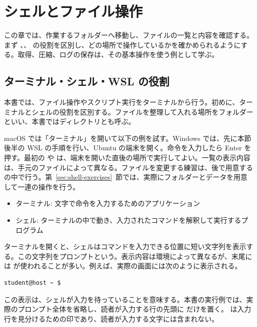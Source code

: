 \chapter{シェルとファイル操作}
\label{chap:shell}

この章では、作業するフォルダーへ移動し、ファイルの一覧と内容を確認する。まず 、、 の役割を区別し、どの場所で操作しているかを確かめられるようにする。取得、圧縮、ログの保存は、その基本操作を使う例として学ぶ。

\section{ターミナル・シェル・WSL の役割}
\label{SEC:shell}
本書では、ファイル操作やスクリプト実行をターミナルから行う。初めに、ターミナルとシェルの役割を区別する。ファイルを整理して入れる場所をフォルダーといい、本書ではディレクトリとも呼ぶ。

macOS では「ターミナル」を開いて以下の例を試す。Windows では、先に本節後半の WSL の手順を行い、Ubuntu の端末を開く。命令を入力したら Enter を押す。最初の  や  は、端末を開いた直後の場所で実行してよい。一覧の表示内容は、手元のファイルによって異なる。ファイルを変更する練習は、後で用意する  の中で行う。第~\ref{sec:shell-exercises}~節では、実際にフォルダーとデータを用意して一連の操作を行う。

\begin{itemize}
\item ターミナル: 文字で命令を入力するためのアプリケーション
\item シェル: ターミナルの中で動き、入力されたコマンドを解釈して実行するプログラム
\end{itemize}

ターミナルを開くと、シェルはコマンドを入力できる位置に短い文字列を表示する。この文字列をプロンプトという。表示内容は環境によって異なるが、末尾には \code{\$} が使われることが多い。例えば、実際の画面には次のように表示される。

\begin{lstlisting}[numbers=none, xleftmargin=2\zw]
student@host ~ $
\end{lstlisting}

この表示は、シェルが入力を待っていることを意味する。本書の実行例では、実際のプロンプト全体を省略し、読者が入力する行の先頭に \code{\$} だけを置く。\code{\$} は入力行を見分けるための印であり、読者が入力する文字には含まれない。

